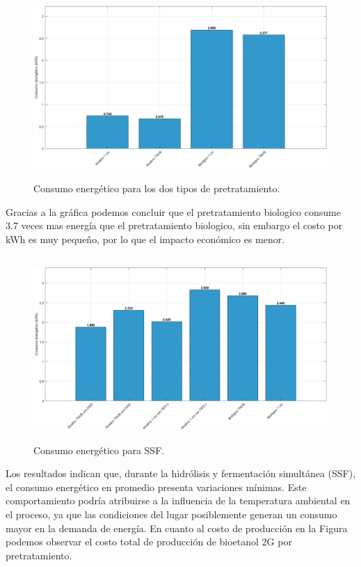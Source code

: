 \documentclass[12pt]{article}
\begin{document}
						\begin{figure} [H]
				\centering
				\includegraphics[width=16cm, height=7cm]{imagenes/consumoenergetico}
				\caption{Consumo energético para los dos tipos de pretratamiento. }
				\label{grafica}
			\end{figure}
			
			Gracias a la gráfica podemos concluir que el pretratamiento biologico consume 3.7 veces mas energía que el pretratamiento biologico, sin embargo el costo por kWh es muy pequeño, por lo que el impacto económico es menor.


\begin{figure} [H]
	\centering
	\includegraphics[width=16cm, height=7cm]{imagenes/CONSUMOENERGETICOSSF}
	\caption{Consumo energético para SSF. }
	\label{grafica}
\end{figure}


Los resultados indican que, durante la hidrólisis y fermentación simultánea (SSF), el consumo energético en promedio presenta variaciones mínimas. Este comportamiento podría atribuirse a la influencia de la temperatura ambiental en el proceso, ya que las condiciones del lugar posiblemente generan un consumo mayor en la demanda de energía.
En cuanto al costo de producción en la Figura podemos observar el costo total de producción de bioetanol 2G por pretratamiento.
\end{document}
